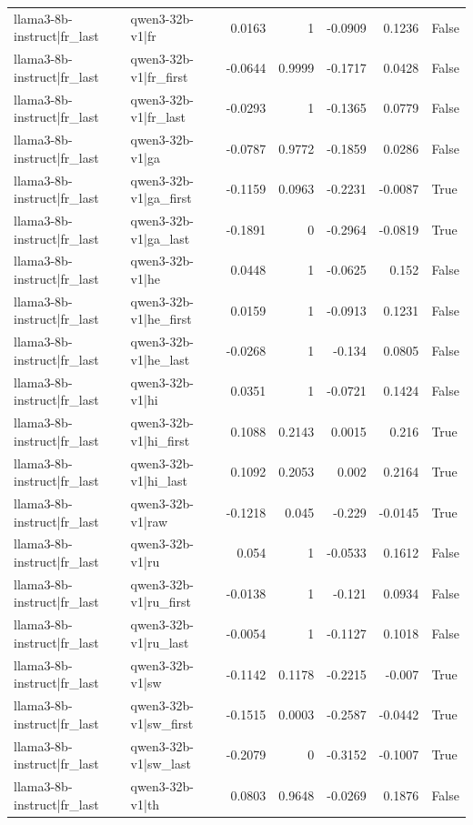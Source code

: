 \begin{table}
\begin{tabular}{l l r r r r l}
llama3-8b-instruct|fr_last & qwen3-32b-v1|fr & 0.0163 & 1 & -0.0909 & 0.1236 & False \\
llama3-8b-instruct|fr_last & qwen3-32b-v1|fr_first & -0.0644 & 0.9999 & -0.1717 & 0.0428 & False \\
llama3-8b-instruct|fr_last & qwen3-32b-v1|fr_last & -0.0293 & 1 & -0.1365 & 0.0779 & False \\
llama3-8b-instruct|fr_last & qwen3-32b-v1|ga & -0.0787 & 0.9772 & -0.1859 & 0.0286 & False \\
llama3-8b-instruct|fr_last & qwen3-32b-v1|ga_first & -0.1159 & 0.0963 & -0.2231 & -0.0087 & True \\
llama3-8b-instruct|fr_last & qwen3-32b-v1|ga_last & -0.1891 & 0 & -0.2964 & -0.0819 & True \\
llama3-8b-instruct|fr_last & qwen3-32b-v1|he & 0.0448 & 1 & -0.0625 & 0.152 & False \\
llama3-8b-instruct|fr_last & qwen3-32b-v1|he_first & 0.0159 & 1 & -0.0913 & 0.1231 & False \\
llama3-8b-instruct|fr_last & qwen3-32b-v1|he_last & -0.0268 & 1 & -0.134 & 0.0805 & False \\
llama3-8b-instruct|fr_last & qwen3-32b-v1|hi & 0.0351 & 1 & -0.0721 & 0.1424 & False \\
llama3-8b-instruct|fr_last & qwen3-32b-v1|hi_first & 0.1088 & 0.2143 & 0.0015 & 0.216 & True \\
llama3-8b-instruct|fr_last & qwen3-32b-v1|hi_last & 0.1092 & 0.2053 & 0.002 & 0.2164 & True \\
llama3-8b-instruct|fr_last & qwen3-32b-v1|raw & -0.1218 & 0.045 & -0.229 & -0.0145 & True \\
llama3-8b-instruct|fr_last & qwen3-32b-v1|ru & 0.054 & 1 & -0.0533 & 0.1612 & False \\
llama3-8b-instruct|fr_last & qwen3-32b-v1|ru_first & -0.0138 & 1 & -0.121 & 0.0934 & False \\
llama3-8b-instruct|fr_last & qwen3-32b-v1|ru_last & -0.0054 & 1 & -0.1127 & 0.1018 & False \\
llama3-8b-instruct|fr_last & qwen3-32b-v1|sw & -0.1142 & 0.1178 & -0.2215 & -0.007 & True \\
llama3-8b-instruct|fr_last & qwen3-32b-v1|sw_first & -0.1515 & 0.0003 & -0.2587 & -0.0442 & True \\
llama3-8b-instruct|fr_last & qwen3-32b-v1|sw_last & -0.2079 & 0 & -0.3152 & -0.1007 & True \\
llama3-8b-instruct|fr_last & qwen3-32b-v1|th & 0.0803 & 0.9648 & -0.0269 & 0.1876 & False \\

\end{tabular}
\end{table}
